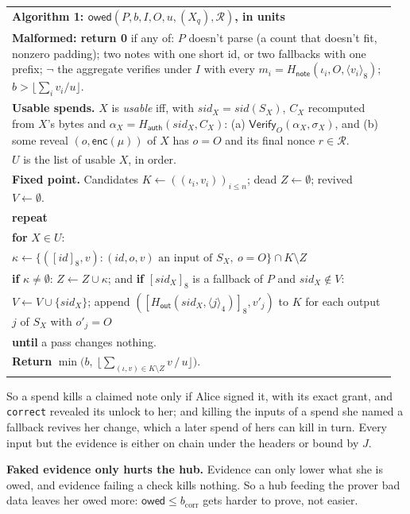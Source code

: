 \documentclass[11pt]{article}
\theoremstyle{plain}
\theoremstyle{definition}
\newcommand{\bcorr}{b_{\mathrm{corr}}}
\newcommand{\tx}[1]{\texttt{#1}}
\newcommand{\be}[2]{\langle #1\rangle_{#2}}          %
\newcommand{\pre}[1]{[#1]_8}                         %
\newcommand{\Ht}[1]{H_{\textsf{#1}}}                 %
\newcommand{\Vfy}{\mathsf{Verify}}
\newcommand{\sid}{\mathit{sid}}
\newcommand{\owed}{\mathsf{owed}}
\newcommand{\enc}{\mathsf{enc}}
\newenvironment{algobox}[1]
  {\par\smallskip\noindent\begin{tabular}{|p{0.955\linewidth}|}\hline\textbf{#1}\\[2pt]}
  {\\\hline\end{tabular}\par\smallskip}
\begin{document}
\begin{algobox}{Algorithm 1: $\owed(P, b, I, O, u, (X_q), \mathcal{R})$, in units}
\textbf{Malformed: return 0} if any of:
$P$ doesn't parse (a count that doesn't fit, nonzero padding);
two notes with one short id, or two fallbacks with one prefix;
$\neg$ the aggregate verifies under $I$ with every $m_i = \Ht{note}(\iota_i, O, \be{v_i}{8})$;
$b > \lfloor \sum_i v_i / u\rfloor$.\\[3pt]
\textbf{Usable spends.} $X$ is \emph{usable} iff, with $\sid_X = \sid(S_X)$,
$C_X$ recomputed from $X$'s bytes and $\alpha_X = \Ht{auth}(\sid_X, C_X)$:
\quad (a) $\Vfy_O(\alpha_X, \sigma_X)$, and
\quad (b) some reveal $(o, \enc(\mu))$ of $X$ has $o = O$ and its final nonce $r \in \mathcal{R}$.\\
$U$ is the list of usable $X$, in order.\\[3pt]
\textbf{Fixed point.} Candidates $K \leftarrow ((\iota_i, v_i))_{i \le n}$; dead $Z \leftarrow \emptyset$; revived $V \leftarrow \emptyset$.\\
\textbf{repeat}\\
\quad \textbf{for} $X \in U$:\\
\quad\quad $\kappa \leftarrow \{(\pre{\mathit{id}}, v) : (\mathit{id}, o, v) \text{ an input of } S_X,\ o = O\} \cap K \setminus Z$\\
\quad\quad \textbf{if} $\kappa \ne \emptyset$: $Z \leftarrow Z \cup \kappa$; and \textbf{if} $\pre{\sid_X}$ is a fallback of $P$ and $\sid_X \notin V$:\\
\quad\quad\quad $V \leftarrow V \cup \{\sid_X\}$; append $(\pre{\Ht{out}(\sid_X, \be{j}{4})}, v'_j)$ to $K$ for each output $j$ of $S_X$ with $o'_j = O$\\
\textbf{until} a pass changes nothing.\\[3pt]
\textbf{Return} $\min\big(b,\ \big\lfloor \sum_{(\iota, v) \in K \setminus Z} v \,/\, u \big\rfloor\big)$.
\end{algobox}

So a spend kills a claimed note only if Alice signed it, with its exact
grant, and \tx{correct} revealed its unlock to her; and killing the
inputs of a spend she named a fallback revives her change, which a later
spend of hers can kill in turn. Every input but the evidence is either
on chain under the headers or bound by $J$.

\textbf{Faked evidence only hurts the hub.} Evidence can only lower
what she is owed, and evidence failing a check kills nothing. So a hub feeding the
prover bad data leaves her owed more: $\owed \le \bcorr$ gets harder to
prove, not easier.
\end{document}
